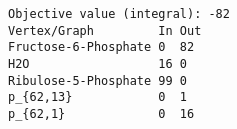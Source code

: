 \begin{verbatim}
Objective value (integral): -82
Vertex/Graph         In Out 
Fructose-6-Phosphate 0  82  
H2O                  16 0   
Ribulose-5-Phosphate 99 0   
p_{62,13}            0  1   
p_{62,1}             0  16  
\end{verbatim}
